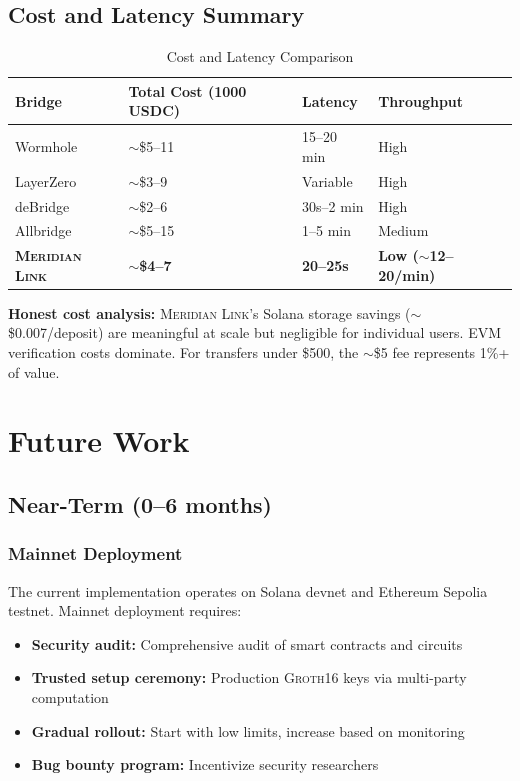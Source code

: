 \documentclass[11pt,a4paper,twoside]{article}
\newcommand{\protocol}{\textsc{Meridian Link}}
\newcommand{\groth}{\textsc{Groth16}}
\begin{document}
\subsection{Cost and Latency Summary}

\begin{table}[H]
\centering
\caption{Cost and Latency Comparison}
\label{tab:cost-latency}
\begin{tabular}{@{}llll@{}}
\toprule
\textbf{Bridge} & \textbf{Total Cost (1000 USDC)} & \textbf{Latency} & \textbf{Throughput} \\
\midrule
Wormhole & $\sim$\$5--11 & 15--20 min & High \\
LayerZero & $\sim$\$3--9 & Variable & High \\
deBridge & $\sim$\$2--6 & 30s--2 min & High \\
Allbridge & $\sim$\$5--15 & 1--5 min & Medium \\
\textbf{\protocol{}} & $\sim$\textbf{\$4--7} & \textbf{20--25s} & \textbf{Low ($\sim$12--20/min)} \\
\bottomrule
\end{tabular}
\end{table}

\textbf{Honest cost analysis:} \protocol{}'s Solana storage savings ($\sim$\$0.007/deposit) are meaningful at scale but negligible for individual users. EVM verification costs dominate. For transfers under \$500, the $\sim$\$5 fee represents 1\%+ of value.

\section{Future Work}
\label{sec:future}

\subsection{Near-Term (0--6 months)}

\subsubsection{Mainnet Deployment}
The current implementation operates on Solana devnet and Ethereum Sepolia testnet. Mainnet deployment requires:
\begin{itemize}
    \item \textbf{Security audit:} Comprehensive audit of smart contracts and circuits
    \item \textbf{Trusted setup ceremony:} Production \groth{} keys via multi-party computation
    \item \textbf{Gradual rollout:} Start with low limits, increase based on monitoring
    \item \textbf{Bug bounty program:} Incentivize security researchers
\end{itemize}
\end{document}
